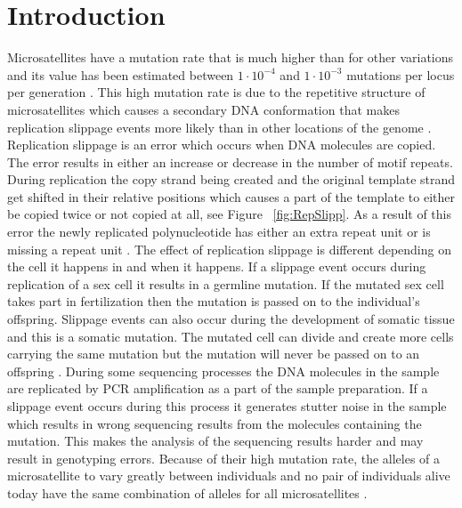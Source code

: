 \documentclass{bioinfo}
\begin{document}
\maketitle

\section{Introduction}
\label{s:intro}
Microsatellites have a mutation rate that is much higher than for other variations and its value has been estimated between $1 \cdot 10^{-4}$ and $1 \cdot 10^{-3}$ mutations per locus per generation \cite{sun2012direct}.
This high mutation rate is due to the repetitive structure of microsatellites which causes a secondary DNA conformation that makes replication slippage events more likely than in other locations of the genome \cite{Mirkin2007}. Replication slippage is an error which occurs when DNA molecules are copied. The error results in either an increase or decrease in the number of motif repeats. During replication the copy strand being created and the original template strand get shifted in their relative positions which causes a part of the template to either be copied twice or not copied at all, see Figure ~\ref{fig:RepSlipp}. As a result of this error the newly replicated polynucleotide has either an extra repeat unit or is missing a repeat unit \cite{Brown2002}.
The effect of replication slippage is different depending on the cell it happens in and when it happens. If a slippage event occurs during replication of a sex cell it results in a germline mutation. If the mutated sex cell takes part in fertilization then the mutation is passed on to the individual's offspring. Slippage events can also occur during the development of somatic tissue and this is a somatic mutation. The mutated cell can divide and create more cells carrying the same mutation but the mutation will never be passed on to an offspring \cite{somatic}. During some sequencing processes the DNA molecules in the sample are replicated by PCR amplification as a part of the sample preparation. If a slippage event occurs during this process it generates stutter noise in the sample which results in wrong sequencing results from the molecules containing the mutation. This makes the analysis of the sequencing results harder and may result in genotyping errors. 
Because of their high mutation rate, the alleles of a microsatellite to vary greatly between individuals \cite{sun2012direct} and no pair of individuals alive today have the same combination of alleles for all microsatellites \cite{Highnam2013}.
\end{document}

